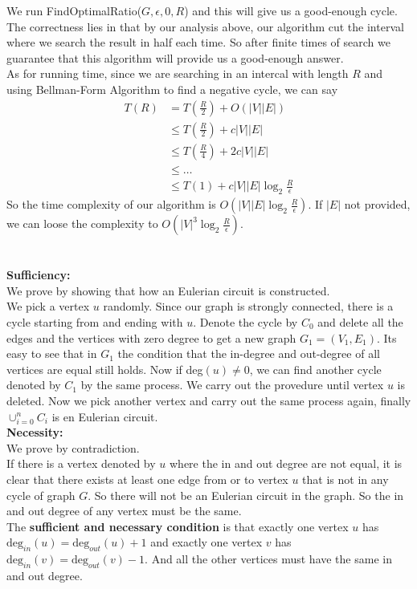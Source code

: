 \documentclass[12pt,letterpaper]{article}
\begin{document}
We run FindOptimalRatio($G,\epsilon,0,R$) and this will give us a good-enough cycle. The correctness lies in that by our analysis above, our algorithm cut the interval where we search the result in half each time. So after finite times of search we guarantee that this algorithm will provide us a good-enough answer.\\
As for running time, since we are searching in an intercal with length $R$ and using Bellman-Form Algorithm to find a negative cycle, we can say 
\begin{align}
    T(R)&=T(\frac{R}{2})+O(|V||E|)\\
    &\leq T(\frac{R}{2})+c|V||E|\\
    &\leq T(\frac{R}{4})+2c|V||E|\\
    &\leq \dots\\
    &\leq T(1)+c|V||E|\log_{2}\frac{R}{\epsilon}
\end{align}
So the time complexity of our algorithm is $O(|V||E|\log_{2}\frac{R}{\epsilon})$. If $|E|$ not provided, we can loose the complexity to $O(|V|^3\log_{2}\frac{R}{\epsilon})$.
\section{}
\subsection{}
\textbf{Sufficiency:}\\
We prove by showing that how an Eulerian circuit is constructed.\\
We pick a vertex $u$ randomly. Since our graph is strongly connected, there is a cycle starting from and ending with $u$. Denote the cycle by $C_0$ and delete all the edges and the vertices with zero degree to get a new graph $G_1=(V_1,E_1)$. Its easy to see that in $G_1$ the condition that the in-degree and out-degree of all vertices are equal still holds. Now if deg$(u)\neq 0$, we can find another cycle denoted by $C_1$ by the same process. We carry out the provedure until vertex $u$ is deleted. Now we pick another vertex and carry out the same process again, finally $\cup_{i=0}^{n}C_i$ is en Eulerian circuit.\\
\textbf{Necessity:}\\
We prove by contradiction.\\
If there is a vertex denoted by $u$ where the in and out degree are not equal, it is clear that there exists at least one edge from or to vertex $u$ that is not in any cycle of graph $G$. So there will not be an Eulerian circuit in the graph. So the in and out degree of any vertex must be the same.\\
The \textbf{sufficient and necessary condition} is that exactly one vertex $u$ has $\text{deg}_{in}(u)=\text{deg}_{out}(u)+1$ and exactly one vertex $v$ has $\text{deg}_{in}(v)=\text{deg}_{out}(v)-1$. And all the other vertices must have the same in and out degree. 
\end{document}
